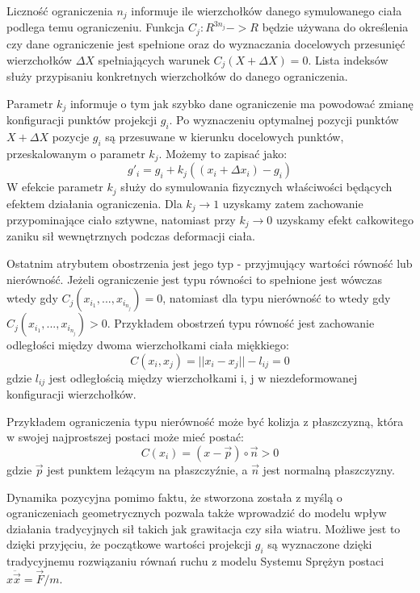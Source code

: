 \raggedright
Liczność ograniczenia $n_j$ informuje ile wierzchołków danego symulowanego ciała 
podlega temu ograniczeniu. Funkcja $C_j : R^{3n_j} -> R$ będzie używana do
określenia czy dane ograniczenie jest spełnione oraz do wyznaczania docelowych
przesunięć wierzchołków $\Delta X$ spełniających warunek $C_j(X + \Delta X) = 0$. 
Lista indeksów służy przypisaniu konkretnych wierzchołków do danego
ograniczenia.

Parametr $k_j$ informuje o tym jak szybko dane ograniczenie ma
powodować zmianę konfiguracji punktów projekcji $g_i$. Po wyznaczeniu
optymalnej pozycji punktów $X + \Delta X$ pozycje $g_i$ są przesuwane w kierunku
docelowych punktów, przeskalowanym o parametr $k_j$. Możemy to zapisać jako:
$$g'_i = g_i + k_j ((x_i + \Delta x_i) - g_i)$$
W efekcie parametr $k_j$ służy do symulowania fizycznych właściwości
będących efektem działania ograniczenia. Dla $k_j \to 1$ uzyskamy zatem
zachowanie przypominające ciało sztywne, natomiast przy $k_j \to 0$ uzyskamy
efekt całkowitego zaniku sił wewnętrznych podczas deformacji ciała.

Ostatnim atrybutem obostrzenia jest jego typ - przyjmujący wartości równość lub
nierówność.  Jeżeli ograniczenie jest typu równości to spełnione jest wówczas
wtedy gdy $C_j(x_{i_1},..., x_{i_{n_j}}) = 0$, natomiast dla typu nierówność to
wtedy gdy $C_j(x_{i_1},..., x_{i_{n_j}}) > 0$.
Przykładem obostrzeń typu równość jest zachowanie odległości między dwoma
wierzchołkami ciała miękkiego:
\begin{equation}
C(x_i, x_j) = || x_i - x_j || - l_{ij} = 0
\end{equation}
gdzie $l_{ij}$ jest odległością między wierzchołkami i, j w niezdeformowanej
konfiguracji wierzchołków.

Przykładem ograniczenia typu nierówność może być kolizja z płaszczyzną, która
w swojej najprostszej postaci może mieć postać:
\begin{equation}
C(x_i) = (x - \vec{p}) \circ \vec{n} > 0
\end{equation}
gdzie $\vec{p}$ jest punktem leżącym na płaszczyźnie, a $\vec{n}$ jest normalną
płaszczyzny.

Dynamika pozycyjna pomimo faktu, że stworzona została z myślą o ograniczeniach
geometrycznych pozwala także wprowadzić do modelu wpływ działania tradycyjnych sił takich jak grawitacja
czy siła wiatru. Możliwe jest to dzięki przyjęciu, że początkowe wartości
projekcji $g_i$ są wyznaczone dzięki tradycyjnemu rozwiązaniu równań ruchu z
modelu Systemu Sprężyn postaci $x \ddot{\vec{x}} = \vec{F} / m$.

